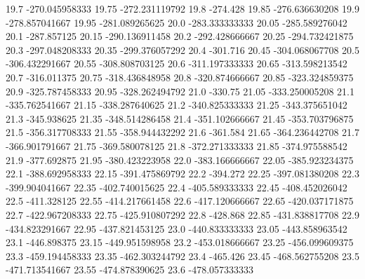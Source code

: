            19.7   -270.045958333
          19.75   -272.231119792
           19.8         -274.428
          19.85   -276.636630208
           19.9   -278.857041667
          19.95   -281.089265625
           20.0   -283.333333333
          20.05   -285.589276042
           20.1      -287.857125
          20.15   -290.136911458
           20.2   -292.428666667
          20.25   -294.732421875
           20.3   -297.048208333
          20.35   -299.376057292
           20.4         -301.716
          20.45   -304.068067708
           20.5   -306.432291667
          20.55   -308.808703125
           20.6   -311.197333333
          20.65   -313.598213542
           20.7      -316.011375
          20.75   -318.436848958
           20.8   -320.874666667
          20.85   -323.324859375
           20.9   -325.787458333
          20.95   -328.262494792
           21.0          -330.75
          21.05   -333.250005208
           21.1   -335.762541667
          21.15   -338.287640625
           21.2   -340.825333333
          21.25   -343.375651042
           21.3      -345.938625
          21.35   -348.514286458
           21.4   -351.102666667
          21.45   -353.703796875
           21.5   -356.317708333
          21.55   -358.944432292
           21.6         -361.584
          21.65   -364.236442708
           21.7   -366.901791667
          21.75   -369.580078125
           21.8   -372.271333333
          21.85   -374.975588542
           21.9      -377.692875
          21.95   -380.423223958
           22.0   -383.166666667
          22.05   -385.923234375
           22.1   -388.692958333
          22.15   -391.475869792
           22.2         -394.272
          22.25   -397.081380208
           22.3   -399.904041667
          22.35   -402.740015625
           22.4   -405.589333333
          22.45   -408.452026042
           22.5      -411.328125
          22.55   -414.217661458
           22.6   -417.120666667
          22.65   -420.037171875
           22.7   -422.967208333
          22.75   -425.910807292
           22.8         -428.868
          22.85   -431.838817708
           22.9   -434.823291667
          22.95   -437.821453125
           23.0   -440.833333333
          23.05   -443.858963542
           23.1      -446.898375
          23.15   -449.951598958
           23.2   -453.018666667
          23.25   -456.099609375
           23.3   -459.194458333
          23.35   -462.303244792
           23.4         -465.426
          23.45   -468.562755208
           23.5   -471.713541667
          23.55   -474.878390625
           23.6   -478.057333333
